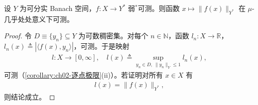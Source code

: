 \documentclass[../../main.tex]{subfiles}%
\begin{document}
\begin{proposition}\label{proposition:ch04-弱星范数可测}\label{proposition:ch04-有界密度}
设 $Y$ 为可分实 Banach 空间，$f:X\to Y^*$ 弱$^*$可测。则函数 $x\mapsto\|f(x)\|_{Y^*}$ 在 $\mu$-几乎处处意义下可测。
\end{proposition}

\begin{proof}
令 $D\equiv\{y_n\}\subseteq Y$ 为可数稠密集。对每个 $n\in\mathbb{N}$，函数 $l_n:X\to\mathbb{R}$，$l_n(x)\triangleq|\langle f(x),y_n\rangle|$，可测。于是映射
\begin{align*}
l:X\to[0,\infty],\quad l(x)\triangleq\sup_{y_n\in D,\ \|y_n\|_Y\leqslant1}l_n(x),
\end{align*}
可测（\cref{corollary:ch02-逐点极限}(ii)）。若证明对所有 $x\in X$ 有
\begin{align}
l(x)=\|f(x)\|_{Y^*}, \label{align:ch04-4.25}
\end{align}
则结论成立。


\end{proof}
\end{document}

